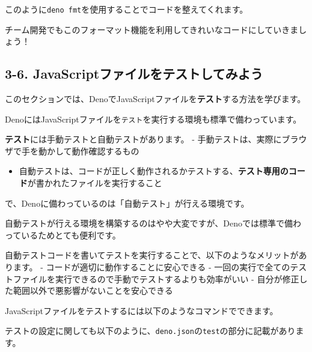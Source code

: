 このように\texttt{deno\ fmt}を使用することでコードを整えてくれます。

チーム開発でもこのフォーマット機能を利用してきれいなコードにしていきましょう！

\subsection{3-6.
JavaScriptファイルをテストしてみよう}\label{javascriptux30d5ux30a1ux30a4ux30ebux3092ux30c6ux30b9ux30c8ux3057ux3066ux307fux3088ux3046}

このセクションでは、DenoでJavaScriptファイルを\textbf{テスト}する方法を学びます。

DenoにはJavaScriptファイルを\texttt{テスト}を実行する環境も標準で備わっています。

\textbf{テスト}には手動テストと自動テストがあります。 -
手動テストは、実際にブラウザで手を動かして動作確認するもの

\begin{itemize}
\tightlist
\item
  自動テストは、コードが正しく動作されるかテストする、\textbf{テスト専用のコード}が書かれたファイルを実行すること
\end{itemize}

で、Denoに備わっているのは「自動テスト」が行える環境です。

自動テストが行える環境を構築するのはやや大変ですが、Denoでは標準で備わっているためとても便利です。

自動テストコードを書いてテストを実行することで、以下のようなメリットがあります。
- コードが適切に動作することに安心できる -
一回の実行で全てのテストファイルを実行できるので手動でテストするよりも効率がいい
- 自分が修正した範囲以外で悪影響がないことを安心できる

JavaScriptファイルをテストするには以下のようなコマンドでできます。

\begin{Shaded}
\begin{Highlighting}[]
\end{Highlighting}
\end{Shaded}

テストの設定に関しても以下のように、\texttt{deno.json}の\texttt{test}の部分に記載があります。

\begin{Shaded}
\begin{Highlighting}[]
   \FunctionTok{\{}
    \FunctionTok{:} \OtherTok{[}
    \OtherTok{]}
  \FunctionTok{\}}
\end{Highlighting}
\end{Shaded}

